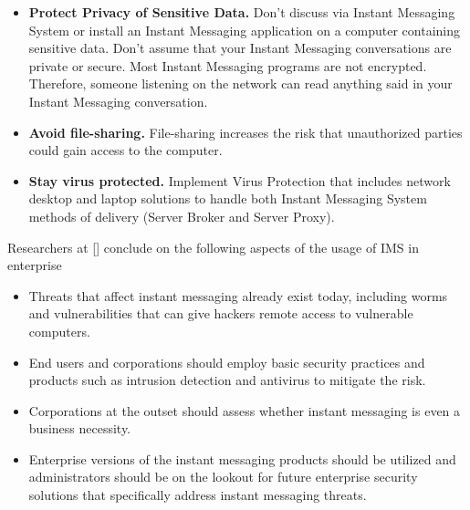 \begin{itemize}
    \item \textbf{Protect Privacy of Sensitive Data.}
    Don't discuss via Instant Messaging System or install an Instant Messaging application on a computer containing
    sensitive data.
    Don't assume that your Instant Messaging conversations are private or secure.
    Most Instant Messaging programs are not encrypted.
    Therefore, someone listening on the network can read anything said in your Instant Messaging conversation.
    \item \textbf{Avoid file-sharing.}
    File-sharing increases the risk that unauthorized parties could gain access to the computer.
    \item \textbf{Stay virus protected.} Implement Virus Protection that includes network desktop and laptop solutions to handle both Instant Messaging System
    methods of delivery (Server Broker and Server Proxy).
\end{itemize}

Researchers at [\cite{hindocha2003malicious}] conclude on the following aspects of the usage of IMS in enterprise

\begin{itemize}
    \item Threats that affect instant messaging already exist today, including worms and vulnerabilities that can
    give hackers remote access to vulnerable computers.
    \item End users and corporations should employ basic security practices and products such as
    intrusion detection and antivirus to mitigate the risk.
    \item Corporations at the outset should assess whether instant messaging is even a business necessity.
    \item Enterprise versions of
    the instant messaging products should be utilized and administrators should be on the lookout for
    future enterprise security solutions that specifically address instant messaging threats.
\end{itemize}